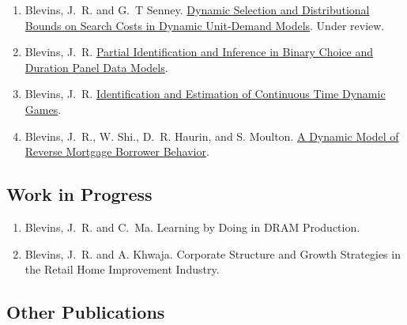 \documentclass[10pt,letterpaper]{article}
\renewenvironment{itemize}{
  \begin{list}{}{
    \setlength{\leftmargin}{1.5em}
    \setlength{\itemsep}{0.25em}
    \setlength{\parskip}{0pt}
    \setlength{\parsep}{0.25em}
  }
}{
  \end{list}
}
\begin{document}
\begin{enumerate}[resume]
\item Blevins, J.~R. and G.~T Senney.
  \href{http://jblevins.org/research/dcs}{Dynamic Selection and Distributional Bounds on Search Costs in Dynamic Unit-Demand Models}.
  Under review.
\item Blevins, J.~R.
  \href{http://jblevins.org/research/panel}{Partial Identification and Inference in Binary Choice and Duration Panel Data Models}.
\item Blevins, J.~R.
  \href{http://jblevins.org/research/ctgames}{Identification and Estimation of Continuous Time Dynamic Games}.
\item Blevins, J.~R., W. Shi., D.~R. Haurin, and S. Moulton.
  \href{http://jblevins.org/research/ddc-hecm}{A Dynamic Model of Reverse Mortgage Borrower Behavior}.
\end{enumerate}

\subsection*{Work in Progress}

\begin{enumerate}[resume]
\item Blevins, J.~R. and C.~Ma.
    Learning by Doing in DRAM Production.
\item Blevins, J.~R. and A. Khwaja.
    Corporate Structure and Growth Strategies in the Retail Home Improvement Industry.
\end{enumerate}

%

\subsection*{Other Publications}
\end{document}
